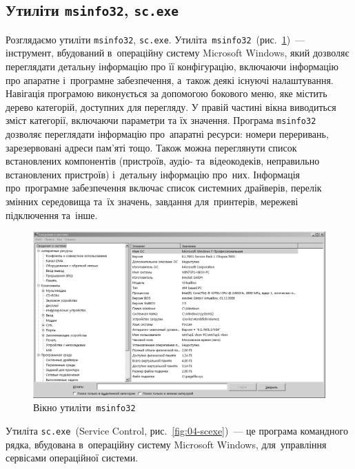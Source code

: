 \documentclass[
	a4paper,
	oneside,
	DIV = 12,
	12pt,
	headings = normal,
]{scrartcl}
\newcommand{\progname}[1]{\texttt{#1}}
\begin{document}
		\subsection{Утиліти \progname{msinfo32}, \progname{sc.exe}}
			Розглядаємо утиліти \progname{msinfo32}, \progname{sc.exe}. Утиліта~\progname{msinfo32}~(рис.~\ref{fig:03-msinfo})~— інструмент, вбудований в~операційну систему Microsoft Windows, який дозволяє переглядати детальну інформацію про її конфігурацію, включаючи інформацію про апаратне і~програмне забезпечення, а~також деякі існуючі налаштування. Навігація програмою виконується за допомогою бокового меню, яке містить дерево категорій, доступних для перегляду. У правій частині вікна виводиться зміст категорії, включаючи параметри та їх значення.
			Програма \texttt{msinfo32} дозволяє переглядати інформацію про~апаратні ресурси: номери переривань, зарезервовані адреси пам'яті тощо. Також можна переглянути список встановлених компонентів (пристроїв, аудіо- та~відеокодеків, неправильно встановлених пристроїв) і~детальну інформацію про~них. Інформація про~програмне забезпечення включає список системних драйверів, перелік змінних середовища та~їх значень, завдання для~принтерів, мережеві підключення та~інше.

			\begin{figure}[!htb]
				\centering
				\includegraphics[height = 12\baselineskip]{./assets/y03s01-syssoft-lab-01-scr-03-msinfo-bw.png}
				\caption{Вікно утиліти~\progname{msinfo32}}
				\label{fig:03-msinfo}
			\end{figure}
			
			Утиліта \progname{sc.exe}~(Service Control, рис.~\ref{fig:04-scexe})~— це програма командного рядка, вбудована в~операційну систему Microsoft Windows, для~управління сервісами операційної системи.
\end{document}

